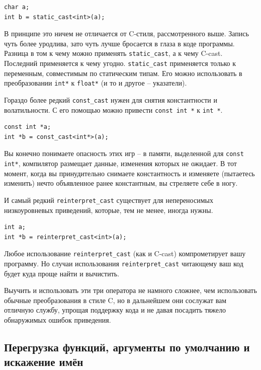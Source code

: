 \documentclass[a4paper,12pt,oneside]{article}
\begin{document}
\begin{lstlisting}
char a;
int b = static_cast<int>(a);
\end{lstlisting}

В принципе это ничем не отличается от C-стиля, рассмотренного выше. Запись чуть более уродлива, зато чуть лучше бросается в глаза в коде программы. Разница в том к чему можно применять \lstinline!static_cast!, а к чему C-cast. Последний применяется к чему угодно. \lstinline!static_cast! применяется только к переменным, совместимым по статическим типам. Его можно использовать в преобразовании \lstinline!int*! к \lstinline!float*! (и то и другое – указатели). 

Гораздо более редкий \lstinline!const_cast! нужен для снятия константности и волатильности. С его помощью можно привести \lstinline!const int *! к \lstinline!int *!. 

\begin{lstlisting}
const int *a;
int *b = const_cast<int*>(a);
\end{lstlisting}

Вы конечно понимаете опасность этих игр – в памяти, выделенной для \lstinline!const int*!, компилятор размещает данные, изменения которых не ожидает. В тот момент, когда вы принудительно снимаете константность и изменяете (пытаетесь изменить) нечто объявленное ранее константным, вы стреляете себе в ногу.

И самый редкий \lstinline!reinterpret_cast! существует для непереносимых низкоуровневых приведений, которые, тем не менее, иногда нужны.

\begin{lstlisting}
int a;
int *b = reinterpret_cast<int>(a);
\end{lstlisting}

Любое использование \lstinline!reinterpret_cast! (как и C-cast) компрометирует вашу программу. Но случаи использования \lstinline!reinterpret_cast! читающему ваш код будет куда проще найти и вычистить.

Выучить и использовать эти три оператора не намного сложнее, чем использовать обычные преобразования в стиле C, но в дальнейшем они сослужат вам отличную службу, упрощая поддержку кода и не давая посадить тяжело обнаружимых ошибок приведения.

\subsection{Перегрузка функций, аргументы по умолчанию и искажение имён}
\end{document}
